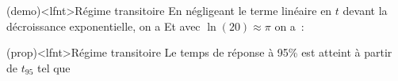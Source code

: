 \documentclass[../../main/main.tex]{subfiles}
\begin{document}
\begin{tcb}[label=demo:transicrit](demo)<lfnt>{Régime transitoire}
	En négligeant le terme linéaire en $t$ devant la décroissance
	exponentielle, on a
	\vspace{-15pt}
	Et avec $\ln(20) \approx \pi$ on a~:
\end{tcb}
\begin{tcb}[label=prop:transicrit](prop)<lfnt>{Régime transitoire}
	Le temps de réponse à 95\% est atteint à partir de $t_{95}$ tel que
	\vspace{-15pt}
\end{tcb}
\end{document}
